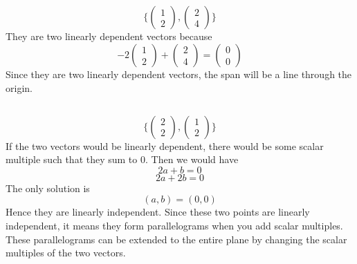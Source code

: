 \documentclass{article}
\begin{document}
\subsection{}
\[\biggl\{\begin{pmatrix} 1 \\ 2 \end{pmatrix}, \begin{pmatrix}
    2 \\4 
\end{pmatrix}\biggl\}\]
They are two linearly dependent vectors because 
\[-2 \begin{pmatrix}
    1 \\ 2
\end{pmatrix} + \begin{pmatrix}
    2 \\ 4
\end{pmatrix} = \begin{pmatrix}
    0 \\ 0
\end{pmatrix} \]
Since they are two linearly dependent vectors, the span will be a line through the origin. 
\subsection{}
\[\biggl \{ \begin{pmatrix}
    2 \\ 2
\end{pmatrix}, \begin{pmatrix}
    1 \\ 2
\end{pmatrix} \biggl \}\]
If the two vectors would be linearly dependent, there would be some scalar multiple such that they sum to $0$. Then we would have 
\[2a+b = 0\]
\[2a+2b=0\]
The only solution is 
\[(a,b) = (0,0)\]
Hence they are linearly independent. Since these two points are linearly independent, it means they form parallelograms when you add scalar multiples. These parallelograms can be extended to the entire plane by changing the scalar multiples of the two vectors. 
\end{document}
